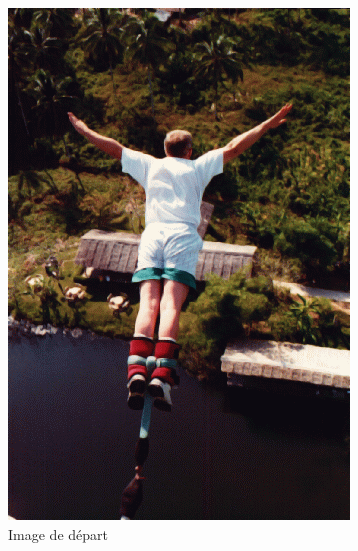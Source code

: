 \documentclass[9pt]{extarticle}
\begin{document}
\begin{figure}[!h]
    \centering
    \begin{subfigure}{0.3\textwidth}
        \centering
        \includegraphics[width=\textwidth]{images/bungee.png}
        \caption{Image de départ}
    \end{subfigure}
    \hspace{0.05\textwidth} 
    \begin{subfigure}{0.3\textwidth}
        \centering

\end{subfigure}
\end{figure}
\end{document}
